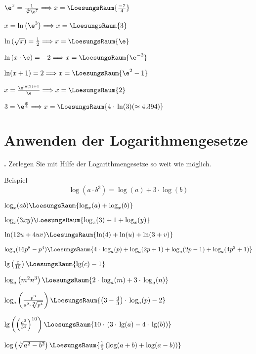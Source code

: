 \begin{bbwAufgabenBlock}
\item $\e^x = \frac1{\sqrt[4]{\e^7}}  \Longrightarrow x =    \LoesungsRaum{\frac{-7}4}$
\item $x = \ln\left(\e^3\right)  \Longrightarrow x =    \LoesungsRaum{3}$
\item $\ln\left(\sqrt{x}\right)  = \frac12  \Longrightarrow x =    \LoesungsRaum{\e}$
\item $\ln\left(x\cdot{} \e \right)  = -2  \Longrightarrow x =    \LoesungsRaum{\e^{-3}}$
\noTRAINER{\newpage}
\item $\ln(x+1) = 2 \Longrightarrow x =    \LoesungsRaum{\e^2 - 1}$
\item $x=\frac{\e^{\ln(2)+1}}{\e} \Longrightarrow x =    \LoesungsRaum{2}$
\item $3 = \e^{\frac{x}4} \Longrightarrow x
=    \LoesungsRaum{4\cdot{} \ln(3) (\approx 4.394)}$

\end{bbwAufgabenBlock}

\newpage

\section{Anwenden der Logarithmengesetze}

\textbf{\bbwAufgabenNummer{}.}
Zerlegen Sie mit Hilfe der Logarithmengesetze so weit wie möglich.

Beispiel $$\log\left(a\cdot{}b^3\right) = \log(a) + 3\cdot{}\log(b)$$

\begin{bbwAufgabenBlock}
\item $\log_x(ab)  \LoesungsRaum{\log_x(a) + \log_x(b)}$
\item $\log_x(3xy)  \LoesungsRaum{\log_x(3) + 1 + \log_x(y)}$
\item $\ln(12u+4uv)  \LoesungsRaum{\ln(4) + \ln(u) + \ln(3+v)}$
\item $\log_a(16p^8-p^4) \LoesungsRaum{4\cdot{}\log_a(p)+ \log_a(2p+1) + \log_a(2p-1)+ \log_a(4p^2+1)}$
\noTRAINER{\newpage}

\item $\lg\left(\frac{c}{10}\right)  \LoesungsRaum{\lg(c) - 1}$
\item $\log_a\left( m^2n^3 \right)  \LoesungsRaum{2\cdot{}\log_a(m) + 3\cdot{}\log_a(n)}$
\item $\log_a\left( \frac{p^3}{a^2 \cdot{} \sqrt[3]{p^4}} \right)  \LoesungsRaum{\left(3-\frac43\right)\cdot{}\log_a(p)- 2}$
\item
$\lg\left(\left(\frac{a^3}{b^4}\right)^{10}\right)  \LoesungsRaum{10\cdot{}\left(3 \cdot{}\lg(a) - 4\cdot{} \lg(b)\right)}$
\noTRAINER{\newpage}

\item $\log \left( \sqrt[5]{a^2-b^2}\right)  \LoesungsRaum{\frac15\left(\log(a+b) + \log(a-b)\right)}$

\end{bbwAufgabenBlock}

